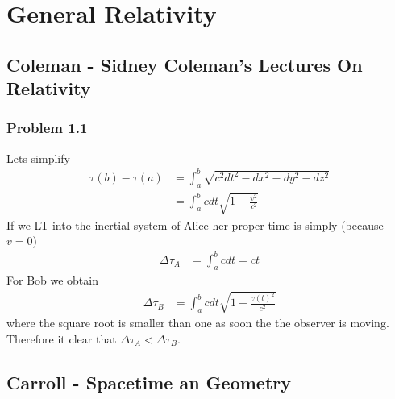 \documentclass[10pt,a4paper]{book}
\theoremstyle{definition}
\begin{document}
\newpage
\chapter{General Relativity}

\section{{\sc Coleman} - Sidney Coleman’s Lectures On Relativity}
\subsection{Problem 1.1}
Lets simplify
\begin{align}
\tau(b)-\tau(a)&=\int_a^b\sqrt{c^2dt^2-dx^2-dy^2-dz^2}\\
&=\int_a^bcdt\sqrt{1-\frac{v^2}{c^2}}
\end{align}
If we LT into the inertial system of Alice her proper time is simply (because $v=0$)
\begin{align}
\Delta\tau_A&=\int_a^bcdt=ct
\end{align}
For Bob we obtain
\begin{align}
\Delta\tau_B&=\int_a^bcdt\sqrt{1-\frac{v(t)^2}{c^2}}
\end{align}
where the square root is smaller than one as soon the the observer is moving. Therefore it clear that $\Delta\tau_A<\Delta\tau_B$.


\section{{\sc Carroll} - Spacetime an Geometry}
\end{document}

